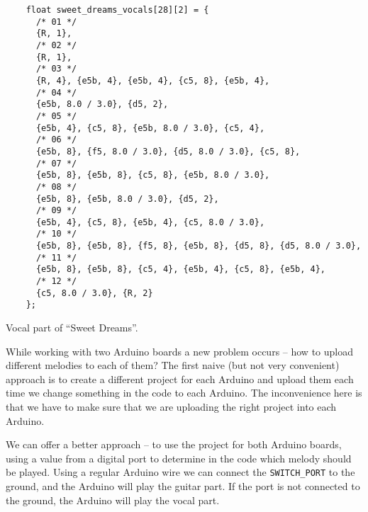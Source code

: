 \documentclass[../sparc.tex]{subfiles}
\begin{document}
\begin{listing}[!h]
  \begin{verbatim}
    float sweet_dreams_vocals[28][2] = {
      /* 01 */
      {R, 1},
      /* 02 */
      {R, 1},
      /* 03 */
      {R, 4}, {e5b, 4}, {e5b, 4}, {c5, 8}, {e5b, 4},
      /* 04 */
      {e5b, 8.0 / 3.0}, {d5, 2},
      /* 05 */
      {e5b, 4}, {c5, 8}, {e5b, 8.0 / 3.0}, {c5, 4},
      /* 06 */
      {e5b, 8}, {f5, 8.0 / 3.0}, {d5, 8.0 / 3.0}, {c5, 8},
      /* 07 */
      {e5b, 8}, {e5b, 8}, {c5, 8}, {e5b, 8.0 / 3.0},
      /* 08 */
      {e5b, 8}, {e5b, 8.0 / 3.0}, {d5, 2},
      /* 09 */
      {e5b, 4}, {c5, 8}, {e5b, 4}, {c5, 8.0 / 3.0},
      /* 10 */
      {e5b, 8}, {e5b, 8}, {f5, 8}, {e5b, 8}, {d5, 8}, {d5, 8.0 / 3.0},
      /* 11 */
      {e5b, 8}, {e5b, 8}, {c5, 4}, {e5b, 4}, {c5, 8}, {e5b, 4},
      /* 12 */
      {c5, 8.0 / 3.0}, {R, 2}
    };
  \end{verbatim}
  \caption{Vocal part of ``Sweet Dreams''.}
  \label{listing:music-band-sweet-dreams-2}
\end{listing}

While working with two Arduino boards a new problem occurs -- how to upload
different melodies to each of them?  The first naive (but not very convenient)
approach is to create a different project for each Arduino and upload them each
time we change something in the code to each Arduino.  The inconvenience here is
that we have to make sure that we are uploading the right project into each
Arduino.

We can offer a better approach -- to use the project for both Arduino boards,
using a value from a digital port to determine in the code which melody should
be played.  Using a regular Arduino wire we can connect the
\texttt{SWITCH\_PORT} to the ground, and the Arduino will play the guitar part.
If the port is not connected to the ground, the Arduino will play the vocal
part.
\end{document}
